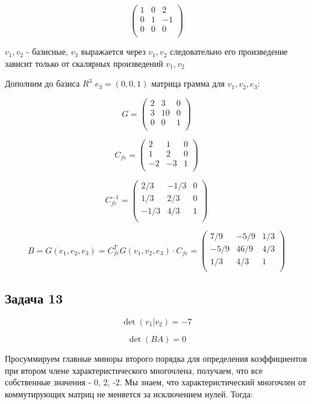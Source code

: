 \documentclass[a4paper,12pt]{article}
\begin{document}
\[
\begin{pmatrix}
    1 & 0 & 2 \\
    0 & 1 & -1 \\
    0 & 0 & 0 \\
\end{pmatrix}
\]

$v_1, v_2$ - базисные, $v_3$ выражается через $v_1, v_2$ следовательно его произведение зависит только от скалярных произведений $v_1, v_2$

Дополним до базиса $R^3$  $e_3 = (0, 0, 1)$ матрица грамма для $v_1, v_2, e_3$:

\[
G =
\begin{pmatrix}
2 & 3 & 0 \\
3 & 10 & 0 \\
0 & 0 & 1 \\
\end{pmatrix}
\]

\[
C_{fe} = \begin{pmatrix}
    2 & 1 & 0 \\
    1 & 2 & 0 \\
    -2 & -3 & 1 \\
\end{pmatrix}
\]

\[
C_{fe}^{-1} = \begin{pmatrix}
    2/3 & -1/3 & 0 \\
    1/3 & 2/3 & 0 \\
    -1/3 & 4/3 & 1 \\
\end{pmatrix}
\]

\[
B = G(e_1, e_2, e_3) = C_{fe}^T G(v_1, v_2, e_3) \cdot C_{fe} = \begin{pmatrix}
    7/9 & -5/9 & 1/3 \\
    -5/9 & 46/9 & 4/3 \\
    1/3 & 4/3 & 1 \\
\end{pmatrix}
\]

\subsection{Задача 13}

\[
\det(v_1|v_2) = -7
\]

\[
\det(BA) = 0
\]

Просуммируем главные миноры второго порядка для определения коэффициентов при втором члене характеристического многочлена, получаем, что все собственные значения - 0, 2, -2. Мы знаем, что характеристический многочлен от коммутирующих матриц не меняется за исключением нулей. Тогда:
\end{document}
